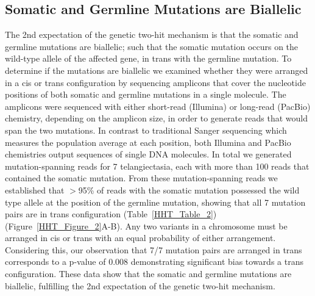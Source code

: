 \subsection{Somatic and Germline Mutations are Biallelic}
The 2nd expectation of the genetic two-hit mechanism is that the somatic and germline mutations are biallelic; such that the somatic mutation occurs on the wild-type allele of the affected gene, in trans with the germline mutation. To determine if the mutations are biallelic we examined whether they were arranged in a cis or trans configuration by sequencing amplicons that cover the nucleotide positions of both somatic and germline mutations in a single molecule. The amplicons were sequenced with either short-read (Illumina) or long-read (PacBio) chemistry, depending on the amplicon size, in order to generate reads that would span the two mutations. In contrast to traditional Sanger sequencing which measures the population average at each position, both Illumina and PacBio chemistries output sequences of single DNA molecules.  In total we generated mutation-spanning reads for 7 telangiectasia, each with more than 100 reads that contained the somatic mutation. From these mutation-spanning reads we established that $>$95\% of reads with the somatic mutation possessed the wild type allele at the position of the germline mutation, showing that all 7 mutation pairs are in trans configuration (Table~\ref{HHT_Table_2}) (Figure~\ref{HHT_Figure_2}A-B). Any two variants in a chromosome must be arranged in cis or trans with an equal probability of either arrangement. Considering this, our observation that 7/7 mutation pairs are arranged in trans corresponds to a p-value of 0.008 demonstrating significant bias towards a trans configuration. These data show that the somatic and germline mutations are biallelic, fulfilling the 2nd expectation of the genetic two-hit mechanism.

